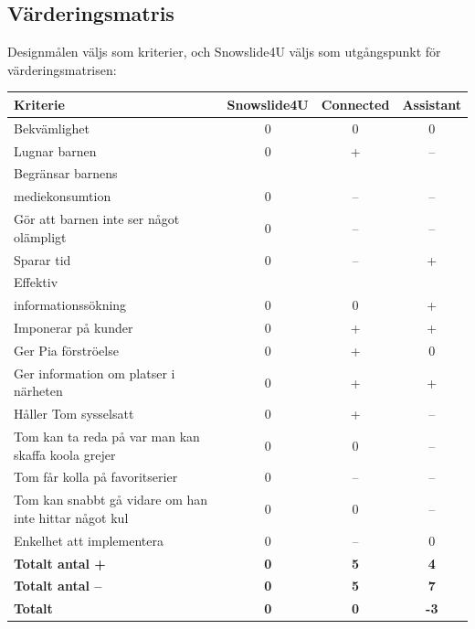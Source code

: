 \documentclass[a4paper,12pt,titlepage]{article}
\begin{document}
\newpage
\subsection*{Värderingsmatris}

Designmålen väljs som kriterier, och Snowslide4U väljs som utgångspunkt för
\\värderingsmatrisen:

\renewcommand*{\arraystretch}{1.3}
\begin{longtable}[l]{p{4cm} c c c}
    \textbf{Kriterie} & \textbf{Snowslide4U} & \textbf{Connected} & \textbf{Assistant} \\ \midrule
    Bekvämlighet                                            & 0 & 0  & 0  \\ \midrule
    Lugnar barnen                                           & 0 & +  & -- \\ \midrule
    Begränsar barnens \\ mediekonsumtion                    & 0 & -- & -- \\ \midrule
    Gör att barnen inte ser något olämpligt                 & 0 & -- & -- \\ \midrule
    Sparar tid                                              & 0 & -- & +  \\ \midrule
    Effektiv \\ informationssökning                         & 0 & 0  & +  \\ \midrule
    Imponerar på kunder                                     & 0 & +  & +  \\ \midrule
    Ger Pia förströelse                                     & 0 & +  & 0  \\ \midrule
    Ger information om platser i närheten                   & 0 & +  & +  \\ \midrule
    Håller Tom sysselsatt                                   & 0 & +  & -- \\ \midrule
    Tom kan ta reda på var man kan skaffa koola grejer      & 0 & 0  & -- \\ \midrule
    Tom får kolla på favoritserier                          & 0 & -- & -- \\ \midrule
    Tom kan snabbt gå vidare om han inte hittar något kul   & 0 & 0  & -- \\ \midrule
    Enkelhet att implementera                               & 0 & --  & 0 \\ \midrule
    \textbf{Totalt antal + }      & \textbf{0} & \textbf{5}  & \textbf{4} \\ \midrule
    \textbf{Totalt antal --}      & \textbf{0} & \textbf{5}  & \textbf{7} \\ \midrule
    \textbf{Totalt}      & \textbf{0} & \textbf{0}  & \textbf{-3} \\
\end{longtable}
\end{document}
